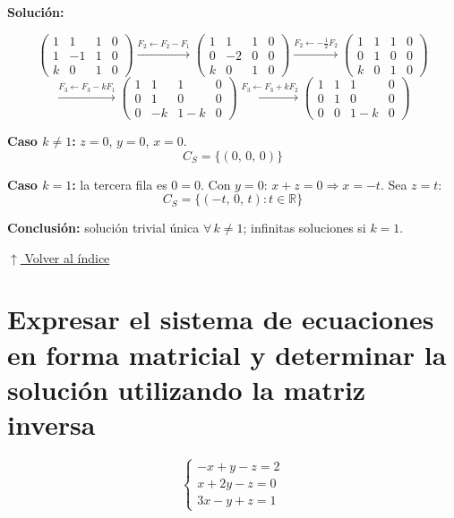 \documentclass[12pt]{article}
\newcommand{\solucion}{%
    \vspace{0.8em}%
    \textbf{Solución:}%
}
\newcommand{\volverindice}{%
    \vspace{1em}%
    \begin{flushright}%
        \hyperlink{indice}{\small $\uparrow$ Volver al índice}%
    \end{flushright}%
}
\begin{document}
\begin{enumerate}[label=\alph*.-]
    \solucion
    \[
    \left(\begin{array}{ccc|c}1&1&1&0\\1&-1&1&0\\k&0&1&0\end{array}\right)
    \xrightarrow{F_2 \leftarrow F_2 - F_1}
    \left(\begin{array}{ccc|c}1&1&1&0\\0&-2&0&0\\k&0&1&0\end{array}\right)
    \xrightarrow{F_2 \leftarrow -\frac{1}{2}F_2}
    \left(\begin{array}{ccc|c}1&1&1&0\\0&1&0&0\\k&0&1&0\end{array}\right)
    \]
    \[
    \xrightarrow{F_3 \leftarrow F_3 - kF_1}
    \left(\begin{array}{ccc|c}1&1&1&0\\0&1&0&0\\0&-k&1-k&0\end{array}\right)
    \xrightarrow{F_3 \leftarrow F_3 + kF_2}
    \left(\begin{array}{ccc|c}1&1&1&0\\0&1&0&0\\0&0&1-k&0\end{array}\right)
    \]

    \textbf{Caso $k \neq 1$:} $z=0$, $y=0$, $x=0$.
    \[\boxed{C_S = \{(0,\,0,\,0)\}}\]

    \textbf{Caso $k = 1$:} la tercera fila es $0=0$. Con $y=0$: $x+z=0 \Rightarrow x=-t$. Sea $z=t$:
    \[\boxed{C_S = \{(-t,\,0,\,t):t\in\mathbb{R}\}}\]

    \textbf{Conclusión:} solución trivial única $\forall\,k\neq1$; infinitas soluciones si $k=1$.
\end{enumerate}

\volverindice
\newpage

\section{Expresar el sistema de ecuaciones en forma matricial y determinar la solución utilizando la matriz inversa}

\[
\begin{cases}
-x + y - z = 2 \\
x + 2y - z = 0 \\
3x - y + z = 1
\end{cases}
\]
\end{document}
